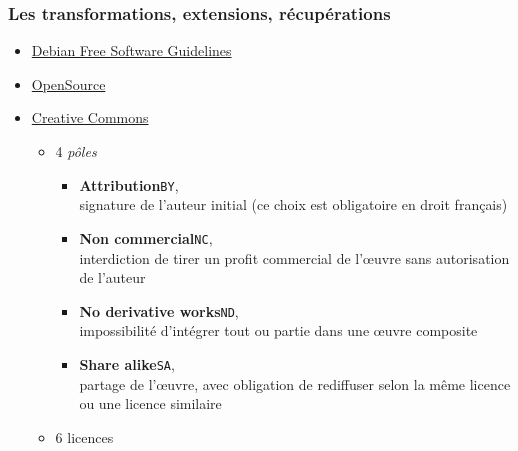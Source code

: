 \documentclass[10pt]{beamer}
\newcommand{\rowstyle}[1]{\gdef\currentrowstyle{#1}#1\ignorespaces}
\begin{document}

\begin{frame}
  \frametitle{Les transformations, extensions, récupérations}

  \begin{itemize}
  \item \href{http://www.debian.org/social_contract\#guidelines}{Debian Free Software Guidelines}
    
    \vfill

  \item \href{http://opensource.org/osd}{OpenSource}

    \vfill

  \item \href{https://creativecommons.org/licenses}{Creative Commons} 
    \begin{itemize}
    \item 4 \emph{pôles}
      \begin{itemize}
      \item \textbf{Attribution}\hfill\texttt{BY}, \ccAttribution\\
        signature de l’auteur initial (ce choix est obligatoire en droit
        français)
        
      \item \textbf{Non commercial}\hfill\texttt{NC}, \ccNonCommercial\\
        interdiction de tirer un profit commercial de l’œuvre sans
        autorisation de l'auteur
        
      \item \textbf{No derivative works}\hfill\texttt{ND}, \ccNoDerivatives\\
        impossibilité d’intégrer tout ou partie dans une œuvre composite
        
      \item \textbf{Share alike}\hfill\texttt{SA}, \ccShareAlike\\
        partage de l’œuvre, avec obligation de rediffuser selon la même
        licence ou une licence similaire
      \end{itemize}
    \item 6 licences
    \end{itemize}
  \end{itemize}
\end{frame}
\end{document}
